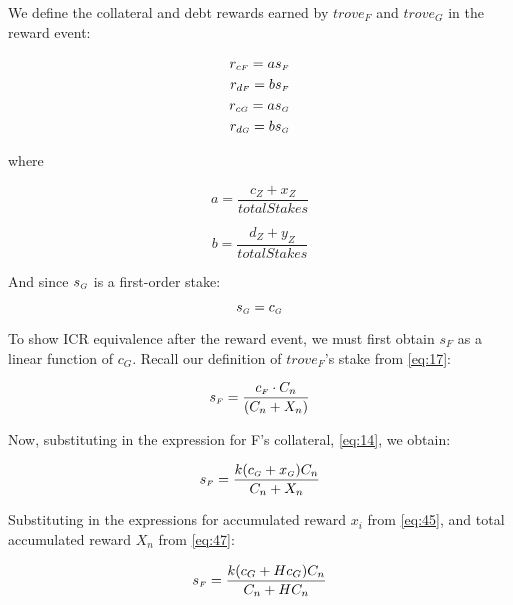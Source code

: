 \documentclass[reqno]{article}
\begin{document}
\bigskip
We define the collateral and debt rewards earned by $trove_F$ and $trove_G$ in the reward event:

\begin{equation} \label{eq:20}
    \begin{split}
        r_{c\mathsmaller{F}}=as_\mathsmaller{F}\\
        r_{d\mathsmaller{F}}=bs_\mathsmaller{F}\\
        r_{c\mathsmaller{G}}=as_\mathsmaller{G}\\
        r_{d\mathsmaller{G}}=bs_\mathsmaller{G}
    \end{split}
\end{equation}

\bigskip
where

\begin{equation} 
    a=\frac{c_Z+x_Z}{totalStakes}
\end{equation}

\begin{equation} 
    b=\frac{d_Z+y_Z}{totalStakes}
\end{equation}

\bigskip
And since $s_\mathsmaller{G}$ is a first-order stake:

\begin{equation} \label{eq:21}
    s_\mathsmaller{G}=c_\mathsmaller{G}
\end{equation}

\bigskip
To show ICR equivalence after the reward event, we must first obtain $s_F$ as a linear function of $c_G$. Recall our definition of $trove_F$’s stake from \ref{eq:17}:

\begin{equation} 
    s_\mathsmaller{F}=\frac{c_\mathsmaller{F} \cdot C_n}{(C_n+X_n)}
\end{equation}

\bigskip
Now, substituting in the expression for F’s collateral, \ref{eq:14}, we obtain:

\begin{equation} 
    s_\mathsmaller{F}=\frac{k(c_\mathsmaller{G}+x_\mathsmaller{G})C_n}{C_n+X_n}
\end{equation}


\bigskip
Substituting in the expressions for accumulated reward $x_i$ from \ref{eq:45}, and total accumulated reward $X_n$ from \ref{eq:47}:

\begin{equation} 
    s_\mathsmaller{F}=\frac{k(c_G+Hc_G)C_n}{C_n+HC_n}
\end{equation}
\end{document}
